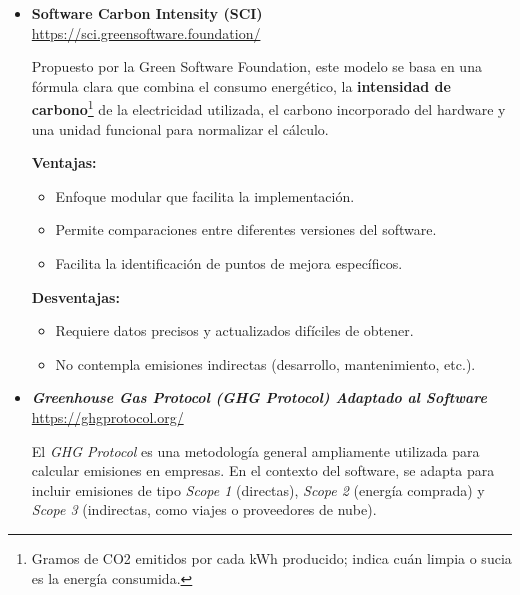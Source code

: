 \documentclass[12pt,a4paper]{report}
\begin{document}
\begin{itemize}
  \item \textbf{Software Carbon Intensity (SCI)} \\
        \href{https://sci.greensoftware.foundation/}{https://sci.greensoftware.foundation/}

        Propuesto por la Green Software Foundation, este modelo se basa en una fórmula clara que combina el consumo energético, la \textbf{intensidad de carbono}\footnote{Gramos de CO2 emitidos por cada kWh producido; indica cuán limpia o sucia es la energía consumida.} de la electricidad utilizada, el carbono incorporado del hardware y una unidad funcional para normalizar el cálculo.

        \textbf{Ventajas:}
        \begin{itemize}
          \item Enfoque modular que facilita la implementación.
          \item Permite comparaciones entre diferentes versiones del software.
          \item Facilita la identificación de puntos de mejora específicos.
        \end{itemize}
        \textbf{Desventajas:}
        \begin{itemize}
          \item Requiere datos precisos y actualizados difíciles de obtener.
          \item No contempla emisiones indirectas (desarrollo, mantenimiento, etc.).
        \end{itemize}

        \vspace{0.8em}

  \item \textit{\textbf{Greenhouse Gas Protocol (GHG Protocol) Adaptado al Software}} \\
        \href{https://ghgprotocol.org/}{https://ghgprotocol.org/}

        El \textit{GHG Protocol} es una metodología general ampliamente utilizada para calcular emisiones en empresas. En el contexto del software, se adapta para incluir emisiones de tipo \textit{Scope 1} (directas), \textit{Scope 2} (energía comprada) y \textit{Scope 3} (indirectas, como viajes o proveedores de nube).


\end{itemize}
\end{document}
